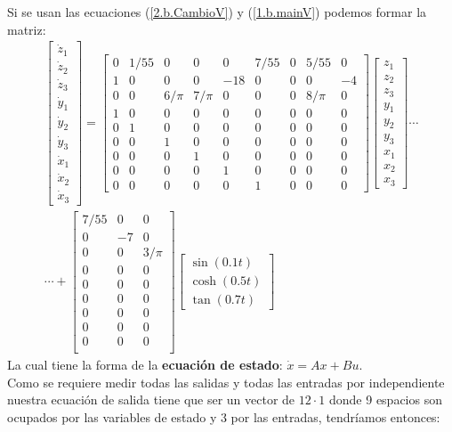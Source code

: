 \documentclass[letterpaper, 12pt]{article}
\begin{document}
\begin{enumerate}
\begin{enumerate}
Si se usan las ecuaciones (\ref{2.b.CambioV}) y (\ref{1.b.mainV}) podemos formar la matriz: \
\begin{multline*}
\begin{bmatrix}
\dot{z}_1\\ 
\dot{z}_2\\ 
\dot{z}_3\\ 
\dot{y}_1\\ 
\dot{y}_2\\ 
\dot{y}_3\\ 
\dot{x}_1\\ 
\dot{x}_2\\ 
\dot{x}_3
\end{bmatrix}
=
\begin{bmatrix}
0 &1/55  &0  &0  &0  &7/55  &0  &5/55  &0 \\ 
1 &0  &0  &0  &-18  &0  &0  &0  &-4 \\ 
0 &0  &6/\pi &7/\pi   &0  &0  &0  &8/\pi   &0 \\ 
1 &0  &0  &0  &0  &0  &0  &0  &0 \\ 
0 &1  &0  &0  &0  &0  &0  &0  &0 \\ 
0 &0  &1  &0  &0  &0  &0  &0  &0 \\ 
0 &0  &0  &1  &0  &0  &0  &0  &0 \\ 
0 &0  &0  &0  &1  &0  &0  &0  &0 \\ 
0 &0  &0  &0  &0  &1  &0  &0  &0 
\end{bmatrix}
\begin{bmatrix}
z_1\\ 
z_2\\ 
z_3\\ 
y_1\\ 
y_2\\ 
y_3\\ 
x_1\\ 
x_2\\ 
x_3
\end{bmatrix}
\cdots \\
\cdots +
\begin{bmatrix}
7/55 &0  &0   \\ 
0 &-7  &0   \\ 
0 &0  &3/\pi \\
0  &0  &0 \\
0  &0  &0 \\
0  &0  &0 \\
0  &0  &0 \\
0  &0  &0 \\
0  &0  &0 \\
\end{bmatrix}
\begin{bmatrix}
\sin(0.1t)\\ 
\cosh(0.5t)\\ 
\tan(0.7t)
\end{bmatrix}
\end{multline*}
La cual tiene la forma de la \textbf{ecuación de estado}: $\dot{x}=Ax+Bu$. \\
Como se requiere medir todas las salidas y todas las entradas por independiente nuestra ecuación de salida tiene que ser un vector de $12\cdot 1$ donde 9 espacios son ocupados por las variables de estado y 3 por las entradas, tendríamos entonces:



\end{enumerate}
\end{enumerate}
\end{document}
